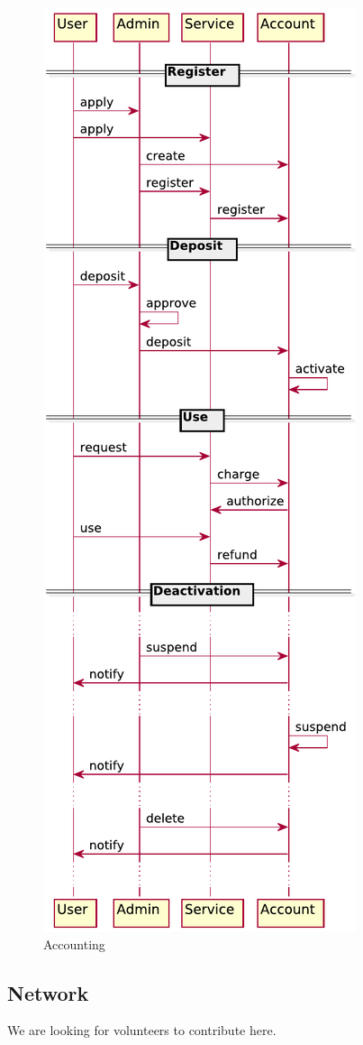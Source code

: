 \documentclass[10pt]{article}
\begin{document}
\begin{figure}[!h]
\centering
\includegraphics[width=0.5\columnwidth]{images/uml/account.pdf}
\caption{Accounting}\label{F:uml-accounting}
\end{figure}



\subsection{Network}

We are looking for volunteers to contribute here.


%

\newpage
\end{document}
